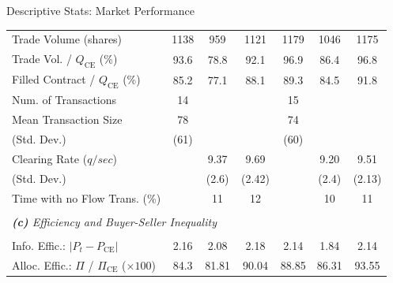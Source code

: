 \documentclass[10pt]{beamer}
\begin{document}
\begin{frame}{Descriptive Stats: Market Performance}
\begin{table}[!h]
{\begin{threeparttable}
\begin{tabular}{lccc|ccc}
     Trade Volume (shares)                     & 1138      & 959       & 1121    & 1179      & 1046      & 1175     \\
     Trade Vol. / $Q_{\text{CE}}$ (\%)        & 93.6      & 78.8      & 92.1    & 96.9      & 86.4     & 96.8   \\
     Filled Contract / $Q_{\text{CE}}$ (\%)     & 85.2      & 77.1    & 88.1      & 89.3      & 84.5   & 91.8   \\
     Num. of Transactions                             & 14        &        &   & 15        &      &     \\
     Mean Transaction Size                      & 78        &         &  & 74        &        &   \\
     \hspace{3mm}(Std. Dev.)             & (61)      &      &     & (60)      &       &    \\
     Clearing Rate ($q/sec$)                 &           & 9.37      & 9.69     &           & 9.20       & 9.51     \\
     
     \hspace{3mm}(Std. Dev.)             &           & (2.6)    & (2.42)     &           & (2.4)     & (2.13)   \\
      Time with no Flow Trans. (\%)               &           & 11      & 12    &           & 10        & 11   \\

     \\ [-1.8ex]
     \multicolumn{7}{l}{\textit{\textbf{(c)} Efficiency and Buyer-Seller Inequality}} \\
     \\ [-1.8ex]
     
     Info. Effic.: $\lvert P_t - P_{\text{CE}} \rvert $        & 2.16      & 2.08    & 2.18  & 2.14      & 1.84    & 2.14  \\     
     Alloc. Effic.: $\Pi$ / $\Pi_{\text{CE}}$ ($\times 100$)   & 84.3      & 81.81    & 90.04     & 88.85     & 86.31     & 93.55   \\
     

\end{tabular}
\end{threeparttable}}
\end{table}
\end{frame}
\end{document}
